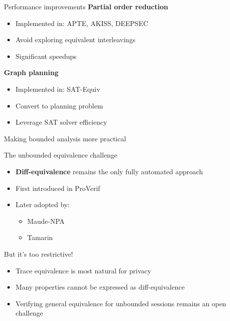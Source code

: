 \documentclass[aspectratio=169, lualatex, handout]{beamer}
\begin{document}
\begin{frame}{Performance improvements}
	\textbf{Partial order reduction}
	\begin{itemize}
		\item Implemented in: APTE, AKISS, DEEPSEC
		\item Avoid exploring equivalent interleavings
		\item Significant speedups
	\end{itemize}
	\vspace{0.5em}
	\textbf{Graph planning}
	\begin{itemize}
		\item Implemented in: SAT-Equiv
		\item Convert to planning problem
		\item Leverage SAT solver efficiency
	\end{itemize}
	\vspace{1em}
	\begin{center}
		Making bounded analysis more practical
	\end{center}
\end{frame}

\begin{frame}{The unbounded equivalence challenge}
	\begin{itemize}
		\item \textbf{Diff-equivalence} remains the only fully automated approach
		\item First introduced in ProVerif
		\item Later adopted by:
		      \begin{itemize}
			      \item Maude-NPA
			      \item Tamarin
		      \end{itemize}
	\end{itemize}
	\vspace{1em}
	\begin{center}
		\Large
		But it's too restrictive!
	\end{center}
	\vspace{0.5em}
	\begin{itemize}
		\item Trace equivalence is most natural for privacy
		\item Many properties cannot be expressed as diff-equivalence
		\item Verifying general equivalence for unbounded sessions remains an open challenge
	\end{itemize}
\end{frame}
\end{document}
